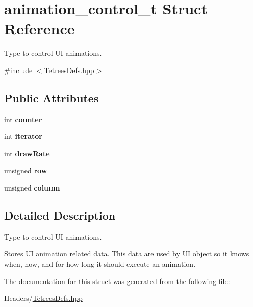 \hypertarget{structanimation__control__t}{}\section{animation\+\_\+control\+\_\+t Struct Reference}
\label{structanimation__control__t}


Type to control UI animations.  




{\ttfamily \#include $<$Tetrees\+Defs.\+hpp$>$}

\subsection*{Public Attributes}
\begin{DoxyCompactItemize}
\item 
\mbox{\label{structanimation__control__t_a73ff393fa08828b3f7a20e7211cad769}} 
int {\bfseries counter}
\item 
\mbox{\label{structanimation__control__t_aef39107b1215226cb22a90eac0193b0d}} 
int {\bfseries iterator}
\item 
\mbox{\label{structanimation__control__t_a1b2d2b9a6c4a602c8f060a93b1adc072}} 
int {\bfseries draw\+Rate}
\item 
\mbox{\label{structanimation__control__t_a8ad7abe75413335a1e7984559ef2a32b}} 
unsigned {\bfseries row}
\item 
\mbox{\label{structanimation__control__t_a311b7da11edaaadae48b595082d3830f}} 
unsigned {\bfseries column}
\end{DoxyCompactItemize}


\subsection{Detailed Description}
Type to control UI animations. 

Stores UI animation related data. This data are used by UI object so it knows when, how, and for how long it should execute an animation. 

The documentation for this struct was generated from the following file\+:\begin{DoxyCompactItemize}
\item 
Headers/\mbox{\hyperlink{TetreesDefs_8hpp}{Tetrees\+Defs.\+hpp}}\end{DoxyCompactItemize}
